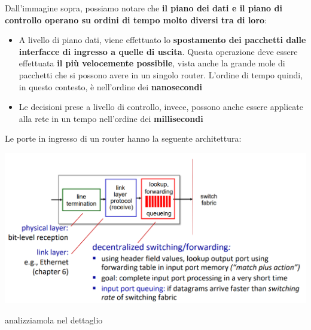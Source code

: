 \documentclass[12pt]{article}
\begin{document}
Dall'immagine sopra, possiamo notare che \textbf{il piano dei dati e il piano di controllo operano su ordini di tempo molto diversi tra di loro}:
\begin{itemize}
    \item A livello di piano dati, viene effettuato lo \textbf{spostamento dei pacchetti dalle interfacce di ingresso a quelle di uscita}. Questa operazione deve essere effettuata \textbf{il più velocemente possibile}, vista anche la grande mole di pacchetti
    che si possono avere in un singolo router. L'ordine di tempo quindi, in questo contesto, è nell'ordine dei \textbf{nanosecondi}
    \item Le decisioni prese a livello di controllo, invece, possono anche essere applicate alla rete in un tempo nell'ordine dei \textbf{millisecondi}
\end{itemize}
Le porte in ingresso di un router hanno la seguente architettura:
\begin{center}
    \includegraphics[width = 1\linewidth]{Images/78.png}
\end{center}
analizziamola nel dettaglio
\end{document}

